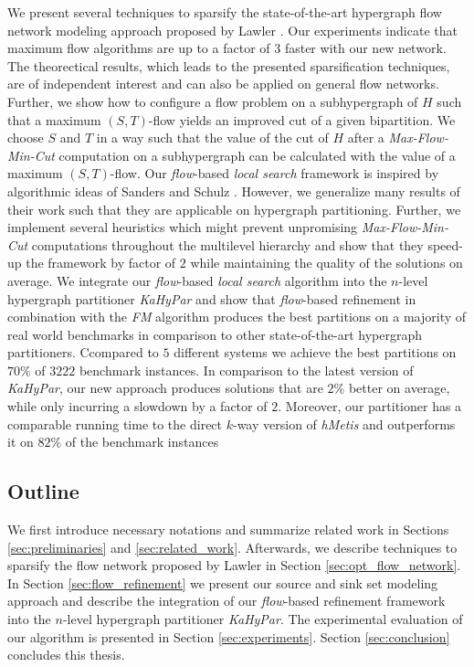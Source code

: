 We present several techniques to sparsify the state-of-the-art hypergraph flow network
modeling approach proposed by Lawler \cite{lawler1973}. Our experiments indicate that
maximum flow algorithms are up to a factor of $3$ faster with our new network. The
theorectical results, which leads to the presented sparsification techniques, are
of independent interest and can also be applied on general flow networks.
Further, we show how to configure a flow problem on a subhypergraph of $H$ such that a 
maximum $(S,T)$-flow yields an improved cut of a given bipartition. We choose $S$ and
$T$ in a way such that the value of the cut of $H$ after a \emph{Max-Flow-Min-Cut} computation on a subhypergraph 
can be calculated with the value of a maximum $(S,T)$-flow.
Our \emph{flow}-based \emph{local search} framework is inspired by algorithmic ideas of
Sanders and Schulz \cite{sanders2011engineering}. However, we generalize many results of
their work such that they are applicable on hypergraph partitioning. Further, we implement
several heuristics which might prevent unpromising \emph{Max-Flow-Min-Cut} computations 
throughout the multilevel hierarchy and show that they speed-up the framework by factor
of $2$ while maintaining the quality of the solutions on average.
We integrate our \emph{flow}-based \emph{local search} algorithm into the $n$-level hypergraph partitioner
\emph{KaHyPar} and show that \emph{flow}-based refinement in combination with the
\emph{FM} algorithm produces the best partitions on a majority of real world benchmarks
in comparison to other state-of-the-art hypergraph partitioners. 
Ccompared to $5$ different systems we achieve the best partitions on $70\%$ 
of $3222$ benchmark instances. In comparison to the 
latest version of \emph{KaHyPar}, our new approach produces solutions that are
$2\%$ better on average, while only incurring a slowdown by a factor of $2$.
Moreover, our partitioner has a comparable running time to the direct $k$-way
version of \emph{hMetis} and outperforms it on $82\%$ of the benchmark instances

\subsection{Outline}

We first introduce necessary notations and summarize related work in Sections \ref{sec:preliminaries}
and \ref{sec:related_work}. Afterwards, we describe techniques to sparsify the flow network
proposed by Lawler \cite{lawler1973} in Section \ref{sec:opt_flow_network}. In Section
\ref{sec:flow_refinement} we present our source and sink set modeling
approach and describe the integration of our \emph{flow}-based refinement framework into
the $n$-level hypergraph partitioner \emph{KaHyPar}. The experimental evaluation of our algorithm
is presented in Section \ref{sec:experiments}. Section \ref{sec:conclusion} concludes this thesis.